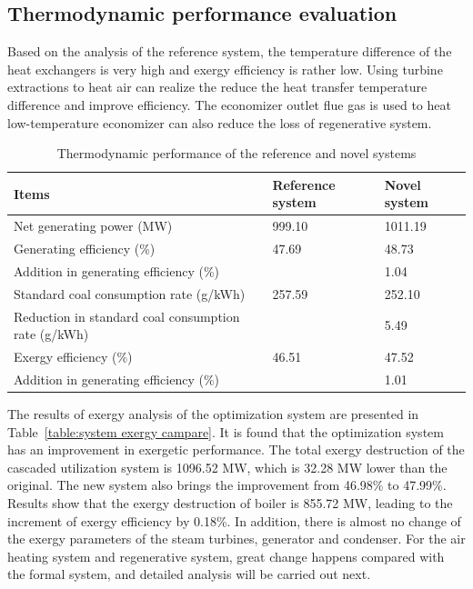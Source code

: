 \documentclass[preprint,12pt]{elsarticle}
\begin{document}
\subsection{Thermodynamic performance evaluation} %
\label{sub:Thermodynamic_evaluation}
Based on the analysis of the reference system, the temperature difference of the heat exchangers is very high and exergy efficiency is rather low.
Using turbine extractions to heat air can realize the reduce the heat transfer temperature difference and improve efficiency. 
The economizer outlet flue gas is used to heat low-temperature economizer can also reduce the loss of regenerative system.



\begin{table}
\caption{Thermodynamic performance of the reference and novel systems}
\label{table:thermal performance compare}
\centering
\begin{tabular}{p{7.5cm}p{1.75cm}p{1.75cm}}
\toprule 
Items & Reference system & Novel system\tabularnewline
\midrule
Net generating power (MW) & 999.10 & 1011.19\tabularnewline
Generating efficiency (\%) & 47.69 & 48.73\tabularnewline
Addition in generating efficiency (\%) &  & 1.04\tabularnewline
Standard coal consumption rate (g/kWh) & 257.59 & 252.10\tabularnewline
Reduction in standard coal consumption rate (g/kWh) &  & 5.49\tabularnewline
Exergy efficiency (\%) & 46.51 & 47.52\tabularnewline
Addition in generating efficiency (\%) &  & 1.01\tabularnewline
\bottomrule
\end{tabular}
\end{table}
The results of exergy analysis of the optimization system are presented in Table~\ref{table:system exergy campare}. 
It is found that the optimization system has an improvement in exergetic performance.
 The total exergy destruction of the cascaded utilization system is 1096.52 MW, which is 32.28 MW lower than the original. 
 The new system also brings the improvement from 46.98\% to 47.99\%. 
 Results show that the exergy destruction of boiler is 855.72 MW, leading to the increment of exergy efficiency by 0.18\%. In addition, there is almost no change of the exergy parameters of the steam turbines, generator and condenser. 
 For the air heating system and regenerative system, great change happens compared with the formal system, and detailed analysis will be carried out next.
\end{document}
